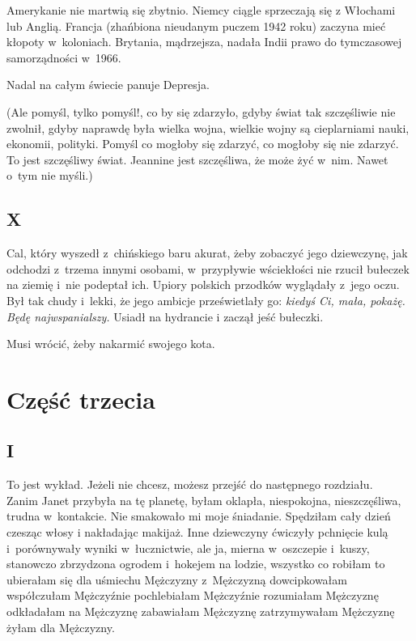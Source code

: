 \documentclass[oneside,polish,12pt,sfheadings]{mwbk}
\begin{document}
Amerykanie nie martwią się zbytnio. Niemcy ciągle sprzeczają się z
Włochami lub Anglią. Francja (zhańbiona nieudanym puczem 1942 roku)
zaczyna mieć kłopoty w~koloniach. Brytania, mądrzejsza, nadała Indii
prawo do tymczasowej samorządności w~1966.

Nadal na całym świecie panuje Depresja.

(Ale pomyśl, tylko pomyśl!, co by się zdarzyło, gdyby świat tak szczęśliwie
nie zwolnił, gdyby naprawdę była wielka wojna, wielkie wojny są cieplarniami
nauki, ekonomii, polityki. Pomyśl co mogłoby się zdarzyć, co mogłoby
się nie zdarzyć. To jest szczęśliwy świat. Jeannine jest szczęśliwa,
że może żyć w~nim. Nawet o~tym nie myśli.)

\chapter{X}

Cal, który wyszedł z~chińskiego baru akurat, żeby zobaczyć jego dziewczynę,
jak odchodzi z~trzema innymi osobami, w~przypływie wściekłości nie
rzucił bułeczek na ziemię i~nie podeptał ich. Upiory polskich przodków
wyglądały z~jego oczu. Był tak chudy i~lekki, że jego ambicje prześwietlały
go: \textit{kiedyś Ci, mała, pokażę. Będę najwspanialszy.}  Usiadł na hydrancie
i zaczął jeść bułeczki.

Musi wrócić, żeby nakarmić swojego kota.

\part*{Część trzecia}

\chapter{I}

To jest wykład. Jeżeli nie chcesz, możesz przejść do następnego rozdziału.
\\

Zanim Janet przybyła na tę planetę, byłam oklapła, niespokojna, nieszczęśliwa, trudna w~kontakcie. Nie
smakowało mi moje śniadanie. Spędziłam cały dzień czesząc włosy i
nakładając makijaż. Inne dziewczyny ćwiczyły pchnięcie kulą i~porównywały
wyniki w~łucznictwie, ale ja, mierna w~oszczepie i~kuszy, stanowczo
zbrzydzona ogrodem i~hokejem na lodzie, wszystko co robiłam to ubierałam
się dla uśmiechu Mężczyzny z~Mężczyzną dowcipkowałam współczułam Mężczyźnie
pochlebiałam Mężczyźnie rozumiałam Mężczyznę odkładałam na Mężczyznę
zabawiałam Mężczyznę zatrzymywałam Mężczyznę żyłam dla Mężczyzny.
\end{document}
